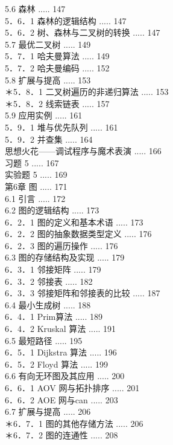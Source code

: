 \documentclass[10pt]{article}
\begin{document}
5.6 森林 ..... 147\\
5．6．1 森林的逻辑结构 ..... 147\\
5．6．2 树、森林与二叉树的转换 ..... 147\\
5.7 最优二叉树 ..... 149\\
5．7．1 哈夫曼算法 ..... 149\\
5．7．2 哈夫曼编码 ..... 152\\
5.8 扩展与提高 ..... 153\\
＊5．8．1 二叉树遍历的非递归算法 ..... 153\\
＊5．8．2 线索链表 ..... 157\\
5.9 应用实例 ..... 161\\
5．9．1 堆与优先队列 ..... 161\\
5．9．2 并查集 ..... 164\\
思想火花——调试程序与魔术表演 ..... 166\\
习题 5 ..... 167\\
实验题 5 ..... 169\\
第6章 图 ..... 171\\
6.1 引言 ..... 172\\
6.2 图的逻辑结构 ..... 173\\
6．2．1 图的定义和基本术语 ..... 173\\
6．2．2 图的抽象数据类型定义 ..... 176\\
6．2．3 图的遍历操作 ..... 176\\
6.3 图的存储结构及实现 ..... 179\\
6．3．1 邻接矩阵 ..... 179\\
6．3．2 邻接表 ..... 182\\
6．3．3 邻接矩阵和邻接表的比较 ..... 187\\
6.4 最小生成树 ..... 188\\
6．4．1 Prim算法 ..... 189\\
6．4．2 Kruskal 算法 ..... 191\\
6.5 最短路径 ..... 195\\
6．5．1 Dijkstra 算法 ..... 196\\
6．5．2 Floyd 算法 ..... 199\\
6.6 有向无环图及其应用 ..... 200\\
6．6．1 AOV 网与拓扑排序 ..... 201\\
6．6．2 AOE 网与can ..... 203\\
6.7 扩展与提高 ..... 206\\
＊6．7．1 图的其他存储方法 ..... 206\\
＊6．7．2 图的连通性 ..... 208\\
\end{document}
